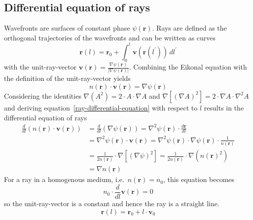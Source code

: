 \subsection{Differential equation of rays}
Wavefronts are surfaces of constant phase \(\psi(\bm{r})\).
Rays are defined as the orthogonal trajectories of the wavefronts and can be written as curves
\begin{equation}
    \bm{r}(l) = \bm{r}_0 + \int_{0}^{l} \bm{v}(\bm{r}(l^{\prime})) \, dl^{\prime}
\end{equation}
with the unit-ray-vector \(\bm{v}(\bm{r}) = \frac{\nabla \psi(\bm{r})}{|\nabla \psi(\bm{r})|}\).
Combining the Eikonal equation with the definition of the unit-ray-vector yields
\begin{equation}\label{ray-differential-equation}
    n(\bm{r}) \cdot \bm{v}(\bm{r}) = \nabla \psi(\bm{r})
\end{equation}
Considering the identities \(\nabla(A^2)= 2 \cdot A \cdot \nabla A\) and \(\nabla[{(\nabla A)}^2] = 2 \cdot \nabla A \cdot \nabla^2 A\) and deriving equation~\eqref{ray-differential-equation} with respect to \(l\) results in the differential equation of rays~\parencite{born_foundations_1999}
\begin{align}
    \frac{d}{dl}(n(\bm{r}) \cdot \bm{v}(\bm{r})) &= \frac{d}{dl}(\nabla \psi(\bm{r})) = \nabla^2 \psi(\bm{r}) \cdot \frac{d\bm{r}}{dl} \\
    &= \nabla^2 \psi(\bm{r}) \cdot \bm{v}(\bm{r}) = \nabla^2 \psi(\bm{r}) \cdot \nabla \psi(\bm{r}) \cdot \frac{1}{n(\bm{r})} \\
    &= \frac{1}{2n(\bm{r})} \cdot \nabla[{(\nabla \psi)}^2] = \frac{1}{2n(\bm{r})} \cdot \nabla({n(\bm{r})}^2) \\
    &= \nabla n(\bm{r})
\end{align}
For a ray in a homogenous medium, i.e.~\(n(\bm{r}) = n_0\), this equation becomes
\begin{equation}
    n_0 \cdot \frac{d}{dl}\bm{v}(\bm{r}) = 0
\end{equation}
so the unit-ray-vector is a constant and hence the ray is a straight line.
\begin{equation}
    \bm{r}(l) = \bm{r}_0 + l \cdot \bm{v}_0
\end{equation}


